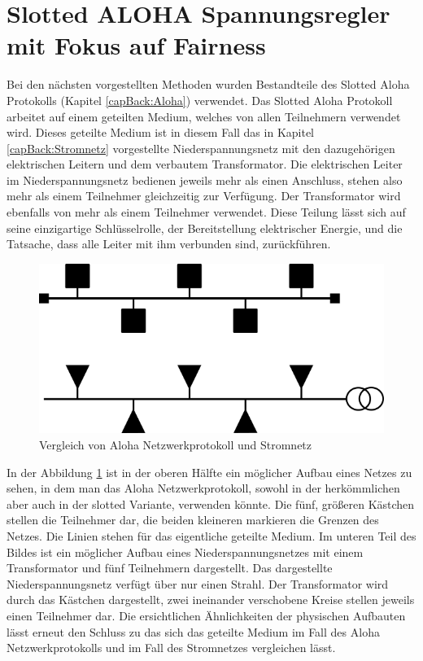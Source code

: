 \section{Slotted ALOHA Spannungsregler mit Fokus auf Fairness}
Bei den nächsten vorgestellten Methoden wurden Bestandteile des Slotted Aloha Protokolls (Kapitel \ref{capBack:Aloha}) verwendet. Das Slotted Aloha Protokoll arbeitet auf einem geteilten Medium, welches von allen Teilnehmern verwendet wird. Dieses geteilte Medium ist in diesem Fall das in Kapitel \ref{capBack:Stromnetz} vorgestellte Niederspannungsnetz mit den dazugehörigen elektrischen Leitern und dem verbautem Transformator. Die elektrischen Leiter im Niederspannungsnetz bedienen jeweils mehr als einen Anschluss, stehen also mehr als einem Teilnehmer gleichzeitig zur Verfügung. Der Transformator wird ebenfalls von mehr als einem Teilnehmer verwendet. Diese Teilung lässt sich auf seine einzigartige Schlüsselrolle, der Bereitstellung elektrischer Energie, und die Tatsache, dass alle Leiter mit ihm verbunden sind, zurückführen.\\
\begin{figure}[htb]
	\centering
	\includegraphics[scale=0.75]{img/sharedMedium3.png}
	\caption{Vergleich von Aloha Netzwerkprotokoll und Stromnetz}
	\label{Abb_sharedmedium}
\end{figure}
In der Abbildung \ref{Abb_sharedmedium} ist in der oberen Hälfte ein möglicher Aufbau eines Netzes zu sehen, in dem man das Aloha Netzwerkprotokoll, sowohl in der herkömmlichen aber auch in der slotted Variante, verwenden könnte. Die fünf, größeren Kästchen stellen die Teilnehmer dar, die beiden kleineren markieren die Grenzen des Netzes. Die Linien stehen für das eigentliche geteilte Medium. Im unteren Teil des Bildes ist ein möglicher Aufbau eines Niederspannungsnetzes mit einem Transformator und fünf Teilnehmern dargestellt. Das dargestellte Niederspannungsnetz verfügt über nur einen Strahl. Der Transformator wird durch das Kästchen dargestellt, zwei ineinander verschobene Kreise stellen jeweils einen Teilnehmer dar. Die ersichtlichen Ähnlichkeiten der physischen Aufbauten lässt erneut den Schluss zu das sich das geteilte Medium im Fall des Aloha Netzwerkprotokolls und im Fall des Stromnetzes vergleichen lässt.\\

